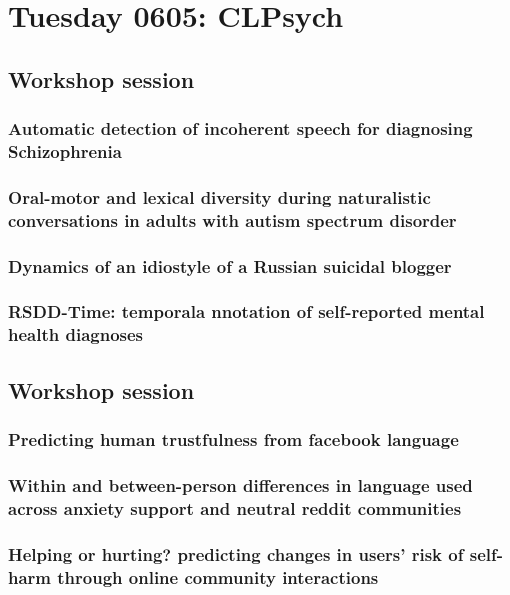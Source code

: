 \section{Tuesday 0605: CLPsych}

\subsection{Workshop session}

\subsubsection{Automatic detection of incoherent speech for diagnosing Schizophrenia}


\subsubsection{Oral-motor and lexical diversity during naturalistic conversations in adults with autism spectrum disorder}


\subsubsection{Dynamics of an idiostyle of a Russian suicidal blogger}


\subsubsection{RSDD-Time: temporala nnotation of self-reported mental health diagnoses}


\subsection{Workshop session}
\subsubsection{Predicting human trustfulness from facebook language}

\subsubsection{Within and between-person differences in language used across anxiety support and neutral reddit communities}


\subsubsection{Helping or hurting? predicting changes in users' risk of self-harm through online community interactions}